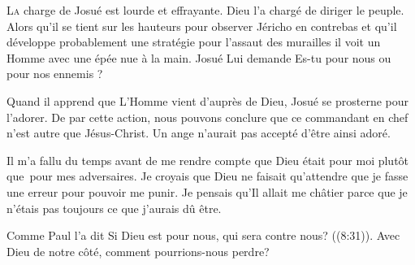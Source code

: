 
\lettrine{L}{a} charge de Josué est lourde et effrayante.
 Dieu l'a chargé de diriger le peuple.
 Alors qu'il se tient sur les hauteurs pour observer Jéricho en contrebas
 \ocadr et qu'il développe probablement une stratégie
 pour l'assaut des murailles \fcadr{}
 il voit un Homme avec une épée nue à la main.
 Josué Lui demande\frcolon{} \Og Es-tu pour nous ou pour nos ennemis ? \Fg{}

Quand il apprend que L'Homme vient d'auprès de Dieu,
 Josué se prosterne pour l'adorer.
 De par cette action, nous pouvons conclure que ce commandant en chef
 n'est autre que Jésus-Christ. Un ange n'aurait pas accepté d'être ainsi adoré.

Il m'a fallu du temps avant de me rendre compte que Dieu
 était pour moi plutôt que~pour mes adversaires.
 Je croyais que Dieu ne faisait qu'attendre
 que je fasse une erreur pour pouvoir me punir.
 Je pensais qu'Il allait me châtier
 parce que je n'étais pas toujours ce que j'aurais dû être.


Comme Paul l'a dit\frcolon{}
 \Og Si Dieu est pour nous, qui sera contre nous? \Fg{} ((8:31)).
 Avec Dieu de notre côté, comment pourrions-nous perdre? 

\dvrule






